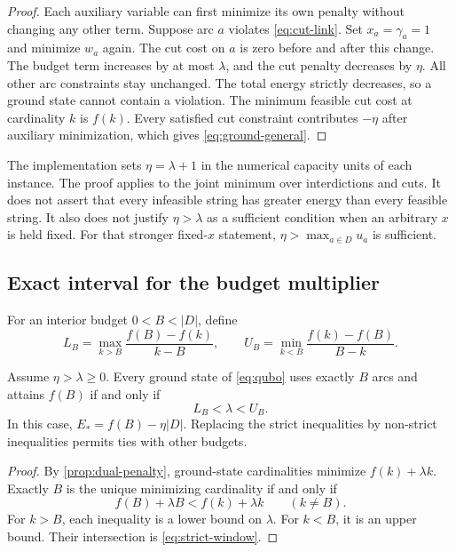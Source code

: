 \documentclass[review,onefignum,onetabnum]{siamart171218}
\begin{document}
\begin{proof}
Each auxiliary variable can first minimize its own penalty without changing any other term.
Suppose arc $a$ violates \cref{eq:cut-link}.
Set $x_a=\gamma_a=1$ and minimize $w_a$ again.
The cut cost on $a$ is zero before and after this change.
The budget term increases by at most $\lambda$, and the cut penalty decreases by $\eta$.
All other arc constraints stay unchanged.
The total energy strictly decreases, so a ground state cannot contain a violation.
The minimum feasible cut cost at cardinality $k$ is $f(k)$.
Every satisfied cut constraint contributes $-\eta$ after auxiliary minimization, which gives \cref{eq:ground-general}.
\end{proof}

The implementation sets $\eta=\lambda+1$ in the numerical capacity units of each instance.
The proof applies to the joint minimum over interdictions and cuts.
It does not assert that every infeasible string has greater energy than every feasible string.
It also does not justify $\eta>\lambda$ as a sufficient condition when an arbitrary $x$ is held fixed.
For that stronger fixed-$x$ statement, $\eta>\max_{a\in D}u_a$ is sufficient.

\subsection{Exact interval for the budget multiplier}
For an interior budget $0<B<|D|$, define
\begin{equation}\label{eq:window}
 L_B=\max_{k>B}\frac{f(B)-f(k)}{k-B},
 \qquad
 U_B=\min_{k<B}\frac{f(k)-f(B)}{B-k}.
\end{equation}

\begin{theorem}\label{thm:window}
Assume $\eta>\lambda\geq0$.
Every ground state of \cref{eq:qubo} uses exactly $B$ arcs and attains $f(B)$ if and only if
\begin{equation}\label{eq:strict-window}
 L_B<\lambda<U_B.
\end{equation}
In this case, $E_*=f(B)-\eta|D|$.
Replacing the strict inequalities by non-strict inequalities permits ties with other budgets.
\end{theorem}
\begin{proof}
By \cref{prop:dual-penalty}, ground-state cardinalities minimize $f(k)+\lambda k$.
Exactly $B$ is the unique minimizing cardinality if and only if
\[
 f(B)+\lambda B<f(k)+\lambda k\qquad(k\neq B).
\]
For $k>B$, each inequality is a lower bound on $\lambda$.
For $k<B$, it is an upper bound.
Their intersection is \cref{eq:strict-window}.
\end{proof}
\end{document}
